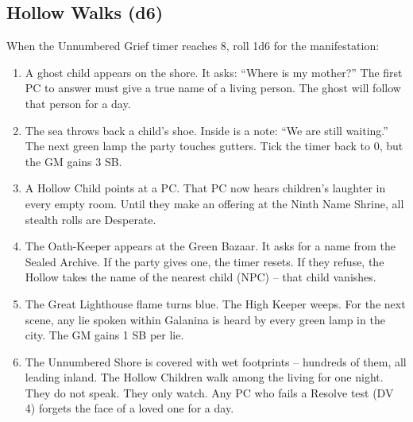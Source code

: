 \subsection*{Hollow Walks (d6)}
When the Unnumbered Grief timer reaches 8, roll 1d6 for the manifestation:
\begin{enumerate}
\item A ghost child appears on the shore. It asks: ``Where is my mother?'' The first PC to answer must give a true name of a living person. The ghost will follow that person for a day.
\item The sea throws back a child's shoe. Inside is a note: ``We are still waiting.'' The next green lamp the party touches gutters. Tick the timer back to 0, but the GM gains 3 SB.
\item A Hollow Child points at a PC. That PC now hears children's laughter in every empty room. Until they make an offering at the Ninth Name Shrine, all stealth rolls are Desperate.
\item The Oath-Keeper appears at the Green Bazaar. It asks for a name from the Sealed Archive. If the party gives one, the timer resets. If they refuse, the Hollow takes the name of the nearest child (NPC) -- that child vanishes.
\item The Great Lighthouse flame turns blue. The High Keeper weeps. For the next scene, any lie spoken within Galanina is heard by every green lamp in the city. The GM gains 1 SB per lie.
\item The Unnumbered Shore is covered with wet footprints -- hundreds of them, all leading inland. The Hollow Children walk among the living for one night. They do not speak. They only watch. Any PC who fails a Resolve test (DV 4) forgets the face of a loved one for a day.
\end{enumerate}

